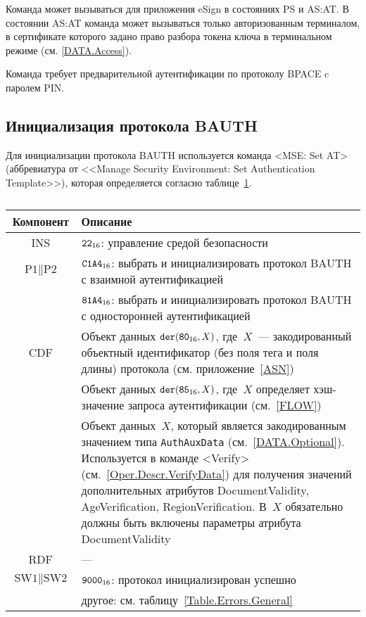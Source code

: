 Команда может вызываться для приложения eSign в 
состояниях PS и AS:AT. В состоянии AS:AT команда 
может вызываться только авторизованным терминалом,
в сертификате которого задано право 
разбора токена ключа в терминальном режиме (см. \ref{DATA.Access}).

Команда требует предварительной аутентификации по 
протоколу BPACE c паролем PIN. 


\subsection{Инициализация протокола BAUTH}
\label{Oper.Descr.SetBAUTH}

Для инициализации протокола BAUTH используется
команда <MSE: Set AT> 
(аббревиатура от <<Manage Security Environment: Set 
Authentication Template>>), 
которая определяется согласно 
таблице~\ref{Table.Oper.SetBAUTHCmd}.

\begin{table}[hbt]
\caption{}\label{Table.Oper.SetBAUTHCmd}
\begin{tabular}{|c|p{14cm}|}
\hline
Компонент & Описание \\
\hline
\hline
INS & $\texttt{22}_{16}$: управление средой безопасности\\ 
\hline
$\text{P1} \parallel\text{P2}$ & $\texttt{C1A4}_{16}$: выбрать и 
инициализировать протокол BAUTH с взаимной 
аутентификацией\\ 
 & $\texttt{81A4}_{16}$: выбрать и инициализировать протокол BAUTH с 
односторонней аутентификацией\\
\hline
CDF & Объект данных 
$\texttt{der}(\texttt{80}_{16}, X)$, где~$X$~--- 
закодированный объектный идентификатор (без поля тега и поля 
длины) протокола (см. приложение~\ref{ASN})\\
 & Объект данных $\texttt{der}(\texttt{85}_{16}, X)$, 
где~$X$ определяет хэш-значение запроса аутентификации (см.~\ref{FLOW})\\
 & Объект данных~$X$, который является 
закодированным значением типа \verb|AuthAuxData| (см.~\ref{DATA.Optional}). 
Используется в команде <Verify> (см.~\ref{Oper.Descr.VerifyData}) 
для получения значений дополнительных атрибутов DocumentValidity, 
AgeVerification, RegionVerification. В~$X$ 
обязательно должны быть включены параметры атрибута DocumentValidity\\
\hline 
RDF &  --- \\
\hline
$\text{SW1} \parallel \text{SW2}$ & 
$\texttt{9000}_{16}$: протокол инициализирован успешно \\
  & другое: см. таблицу~\ref{Table.Errors.General}\\
\hline
\end{tabular}
\end{table}

